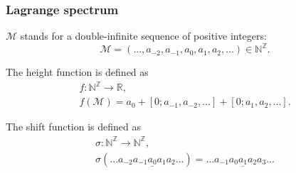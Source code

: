 \begin{frame}
\frametitle{Lagrange spectrum}

\begin{definition}
	$\mathcal{M}$ stands for a double-infinite sequence of positive integers:
	\begin{equation*}
		\mathcal{M} =
		\left(..., a_{-2}, a_{-1}, a_0, a_1, a_2, ...\right)
		\in \mathbb{N}^\mathbb{Z}.
	\end{equation*}
\end{definition}

\begin{definition}
	The height function is defined as
	\begin{equation*}
		\begin{gathered}
			f : \mathbb{N}^\mathbb{Z} \rightarrow \mathbb{R},\\
			f(\mathcal{M}) = a_0 + [0; a_{-1}, a_{-2}, ...] + [0; a_{1}, a_{2}, ...].
		\end{gathered}
	\end{equation*}
\end{definition}

\begin{definition}
	The shift function is defined as
	\begin{equation*}
		\begin{gathered}
			\sigma : \mathbb{N}^\mathbb{Z} \rightarrow \mathbb{N}^\mathbb{Z},\\
			\sigma(... a_{-2} a_{-1} \underline{a_0} a_1 a_2 ...) = ... a_{-1} a_{0} \underline{a_1} a_2 a_3 ...
		\end{gathered}
	\end{equation*}
\end{definition}

\end{frame}
